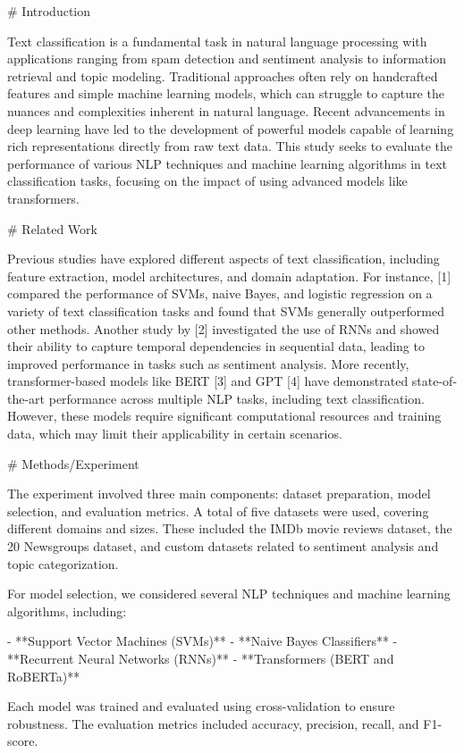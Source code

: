 # Introduction

Text classification is a fundamental task in natural language processing with applications ranging from spam detection and sentiment analysis to information retrieval and topic modeling. Traditional approaches often rely on handcrafted features and simple machine learning models, which can struggle to capture the nuances and complexities inherent in natural language. Recent advancements in deep learning have led to the development of powerful models capable of learning rich representations directly from raw text data. This study seeks to evaluate the performance of various NLP techniques and machine learning algorithms in text classification tasks, focusing on the impact of using advanced models like transformers.

# Related Work

Previous studies have explored different aspects of text classification, including feature extraction, model architectures, and domain adaptation. For instance, [1] compared the performance of SVMs, naive Bayes, and logistic regression on a variety of text classification tasks and found that SVMs generally outperformed other methods. Another study by [2] investigated the use of RNNs and showed their ability to capture temporal dependencies in sequential data, leading to improved performance in tasks such as sentiment analysis. More recently, transformer-based models like BERT [3] and GPT [4] have demonstrated state-of-the-art performance across multiple NLP tasks, including text classification. However, these models require significant computational resources and training data, which may limit their applicability in certain scenarios.

# Methods/Experiment

The experiment involved three main components: dataset preparation, model selection, and evaluation metrics. A total of five datasets were used, covering different domains and sizes. These included the IMDb movie reviews dataset, the 20 Newsgroups dataset, and custom datasets related to sentiment analysis and topic categorization.

For model selection, we considered several NLP techniques and machine learning algorithms, including:

- **Support Vector Machines (SVMs)**
- **Naive Bayes Classifiers**
- **Recurrent Neural Networks (RNNs)**
- **Transformers (BERT and RoBERTa)**

Each model was trained and evaluated using cross-validation to ensure robustness. The evaluation metrics included accuracy, precision, recall, and F1-score.


